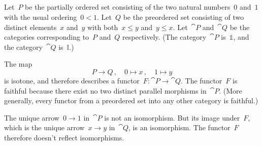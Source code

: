\subsection{}

Let~$P$ be the partially ordered set consisting of the two natural numbers~$0$ and~$1$ with the usual ordering~$0 < 1$.
Let~$Q$ be the preordered set consisting of two distinct elements~$x$ and~$y$ with both~$x ≤ y$ and~$y ≤ x$.
Let~$\cat{P}$ and~$\cat{Q}$ be the categories corresponding to~$P$ and~$Q$ respectively.
(The category~$\cat{P}$ is~$𝟙$, and the category~$\cat{Q}$ is~$𝕀$.)

The map
\[
	P \to Q \,,
	\quad
	0 \mapsto x \,,
	\quad
	1 \mapsto y
\]
is isotone, and therefore describes a functor~$F \colon \cat{P} \to \cat{Q}$.
The functor~$F$ is faithful because there exist no two distinct parallel morphisms in~$\cat{P}$.
(More generally, every functor from a preordered set into any other category is faithful.)

The unique arrow~$0 \to 1$ in~$\cat{P}$ is not an isomorphism.
But its image under~$F$, which is the unique arrow~$x \to y$ in~$\cat{Q}$, is an isomorphism.
The functor~$F$ therefore doesn’t reflect isomorphisms.

